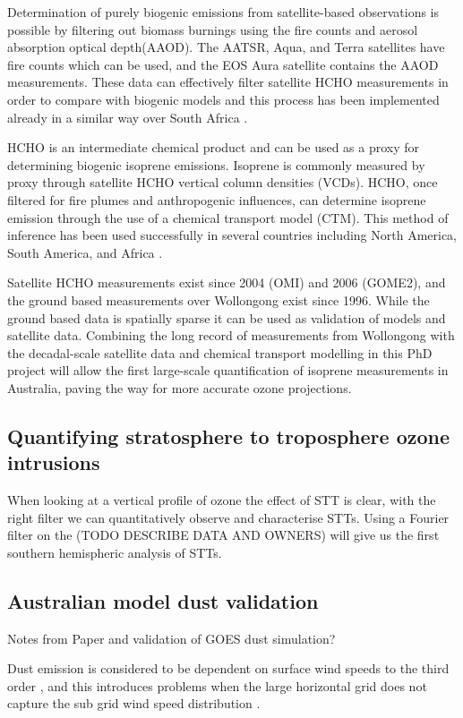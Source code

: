 Determination of purely biogenic emissions from satellite-based observations is possible by filtering out biomass burnings using the fire counts and aerosol absorption optical depth(AAOD). The AATSR, Aqua, and Terra satellites have fire counts which can be used, and the EOS Aura satellite contains the AAOD measurements. These data can effectively filter satellite HCHO measurements in order to compare with biogenic models and this process has been implemented already in a similar way over South Africa \cite{Marais_2012}.

HCHO is an intermediate chemical product and can be used as a proxy for determining biogenic isoprene emissions. 
Isoprene is commonly measured by proxy through satellite HCHO vertical column densities (VCDs). HCHO, once filtered for fire plumes and anthropogenic influences, can determine isoprene emission through the use of a chemical transport model (CTM).
This method of inference has been used successfully in several countries including North America\cite{Palmer_2003}, South America\cite{Barkley_2013}, and Africa \cite{Marais_2012}.

Satellite HCHO measurements exist since 2004 (OMI) and 2006 (GOME2), and the ground based measurements over Wollongong exist since 1996. While the ground based data is spatially sparse it can be used as validation of models and satellite data. Combining the long record of measurements from Wollongong with the decadal-scale satellite data and chemical transport modelling in this PhD project will allow the first large-scale quantification of isoprene measurements in Australia, paving the way for more accurate ozone projections.

\subsection{Quantifying stratosphere to troposphere ozone intrusions}
When looking at a vertical profile of ozone the effect of STT is clear, with the right filter we can quantitatively observe and characterise STTs.
Using a Fourier filter on the (TODO DESCRIBE DATA AND OWNERS) will give us the first southern hemispheric analysis of STTs.


\subsection{Australian model dust validation}
Notes from Paper and validation of GOES dust simulation?
  
Dust emission is considered to be dependent on surface wind speeds to the third order \citep{Duncan_Fairlie_2007}, and this introduces problems when the large horizontal grid does not capture the sub grid wind speed distribution \cite{Ridley_2013}.
  
  
  
  
  